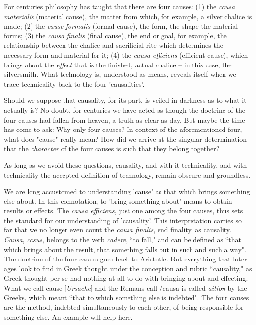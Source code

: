 For centuries philosophy has taught that there are four causes: (1) the \textit{causa materialis} (material cause), the matter from which, for example, a silver chalice is made; (2) the \textit{cause formalis} (formal cause), the form, the shape the material forms; (3) the \textit{causa finalis} (final cause), the end or goal, for example, the relationship between the chalice and sacrificial rite which determines the necessary form and material for it; (4) the \textit{causa efficiens} (efficient cause), which brings about the \textit{effect} that is the finished, actual chalice -- in this case, the silversmith. What technology is, understood as means, reveals itself when we trace technicality back to the four 'causalities'.

Should we suppose that causality, for its part, is veiled in darkness as to what it actually is? No doubt, for centuries we have acted as though the doctrine of the four causes had fallen from heaven, a truth as clear as day. But maybe the time has come to ask: Why only four causes? In context of the aforementioned four, what does "cause" really mean? How did we arrive at the singular determination that the \textit{character} of the four causes is such that they belong together?

As long as we avoid these questions, causality, and with it technicality, and with technicality the accepted definition of technology, remain obscure and groundless.

We are long accustomed to understanding 'cause' as that which brings something else about. In this connotation, to 'bring something about' means to obtain results or effects. The \textit{causa efficiens}, just one among the four causes, thus sets the standard for our understanding of 'causality'. This interpretation carries so far that we no longer even count the \textit{causa finalis}, end finality, as causality. \textit{Causa}, \textit{casus}, belongs to the verb \textit{cadere}, ``to fall," and can be defined as ``that which brings about the result, that something falls out in such and such a way". The doctrine of the four causes goes back to Aristotle. But everything that later ages look to find in Greek thought under the conception and rubric ``causality," as Greek thought per se had nothing at all to do with bringing about and effecting. What we call cause [\textit{Ursache}] and the Romans call /{causa} is called \textit{aition} by the Greeks, which meant ``that to which something else is indebted". The four causes are the method, indebted simultaneously to each other, of being responsible for something else. An example will help here.

